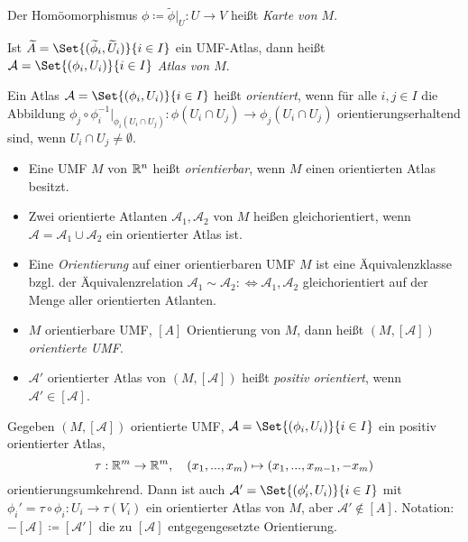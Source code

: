 \documentclass{cheat-sheet}
\newcommand{\Atlas}{\mathcal{A}} %
\begin{document}
\begin{defn}
  Der Homöomorphismus $\phi \coloneqq \widetilde{\phi}|_{U} : U \to V$ heißt \emph{Karte von $M$}.
\end{defn}

\begin{defn}
  Ist $\widetilde{A} = \Set{ (\widetilde{\phi}_i, \widetilde{U}_i) }{ i \in I }$ ein UMF-Atlas, dann heißt $\Atlas = \Set{ (\phi_i, U_i) }{ i \in I }$ \emph{Atlas von $M$}.
\end{defn}

\begin{defn}
  Ein Atlas $\Atlas = \Set{ (\phi_i, U_i) }{ i \in I }$ heißt \emph{orientiert}, wenn für alle $i, j \in I$ die Abbildung $\phi_j \circ \phi_i^{-1} |_{\phi_i(U_i \cap U_j)} : \phi(U_i \cap U_j) \to \phi_j(U_i \cap U_j)$ orientierungserhaltend sind, wenn $U_i \cap U_j \not= \emptyset$.
\end{defn}

\begin{defn}
  \begin{itemize}
    \item Eine UMF $M$ von $\mathbb{R}^n$ heißt \emph{orientierbar}, wenn $M$ einen orientierten Atlas besitzt.
    \item Zwei orientierte Atlanten $\Atlas_1, \Atlas_2$ von $M$ heißen gleichorientiert, wenn $\Atlas = \Atlas_1 \cup \Atlas_2$ ein orientierter Atlas ist.
    \item Eine \emph{Orientierung} auf einer orientierbaren UMF $M$ ist eine Äquivalenzklasse bzgl. der Äquivalenzrelation $\Atlas_1 \sim \Atlas_2 :\iff \Atlas_1, \Atlas_2$ gleichorientiert auf der Menge aller orientierten Atlanten.
    \item $M$ orientierbare UMF, $[A]$ Orientierung von $M$, dann heißt $(M, [\Atlas])$ \emph{orientierte UMF}.
    \item $\Atlas'$ orientierter Atlas von $(M, [\Atlas])$ heißt \emph{positiv orientiert}, wenn $\Atlas' \in [\Atlas]$.
  \end{itemize}
\end{defn}

Gegeben $(M, [\Atlas])$ orientierte UMF, $\Atlas = \Set{ (\phi_i, U_i) }{ i \in I }$ ein positiv orientierter Atlas,
\[ \tau : \mathbb{R}^m \to \mathbb{R}^m, \quad (x_1, ..., x_m) \mapsto (x_1, ..., x_{m-1}, - x_m) \]
orientierungsumkehrend. Dann ist auch $\Atlas' = \Set{ (\phi_i', U_i) }{ i \in I }$ mit $\phi_i' = \tau \circ \phi_i : U_i \to \tau(V_i)$
ein orientierter Atlas von $M$, aber $\Atlas' \not\in [A]$.
Notation: $-[\Atlas] \coloneqq [\Atlas']$ die zu $[\Atlas]$ entgegengesetzte Orientierung.
\end{document}
